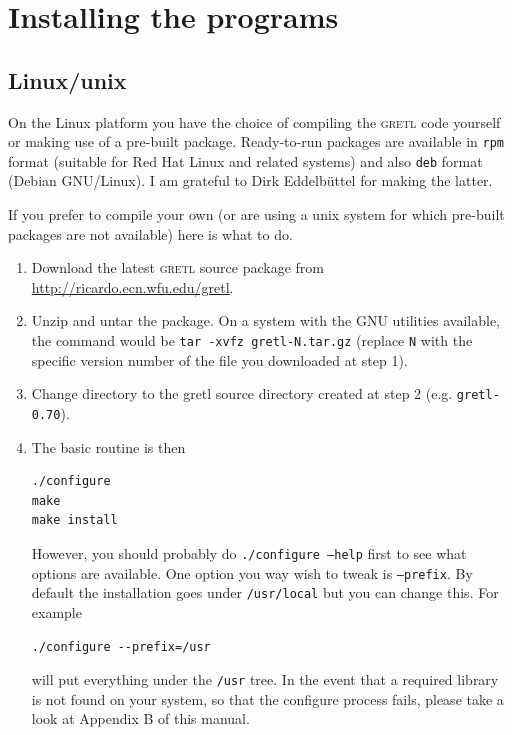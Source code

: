\documentclass{article}
\begin{document}
\section{Installing the programs}
\label{install}

\subsection{Linux/unix}

On the Linux platform you have the choice of compiling the
\textsc{gretl} code yourself or making use of a pre-built package.
Ready-to-run packages are available in \texttt{rpm} format (suitable
for Red Hat Linux and related systems) and also \texttt{deb} format
(Debian GNU/Linux).  I am grateful to Dirk Eddelb\"uttel for making
the latter.

If you prefer to compile your own (or are using a unix system for
which pre-built packages are not available) here is what to do.

\begin{enumerate}
\item Download the latest \textsc{gretl} source package from
  \url{http://ricardo.ecn.wfu.edu/gretl}.  
\item Unzip and untar the package.  On a system with the GNU utilities
  available, the command would be \texttt{tar -xvfz gretl-N.tar.gz}
  (replace \texttt{N} with the specific version number of the file
  you downloaded at step 1).
\item Change directory to the gretl source directory created at step 2
  (e.g. \texttt{gretl-0.70}).  
\item The basic routine is then

\begin{verbatim}
./configure
make
make install
\end{verbatim}
  
  However, you should probably do \texttt{./configure --help} first
  to see what options are available.  One option you way wish to tweak
  is \texttt{--prefix}.  By default the installation goes under
  \texttt{/usr/local} but you can change this.  For example

\begin{verbatim}
./configure --prefix=/usr
\end{verbatim}

will put everything under the \texttt{/usr} tree.  In the event that a
required library is not found on your system, so that the configure
process fails, please take a look at Appendix B of this manual.

\end{enumerate}
\end{document}
